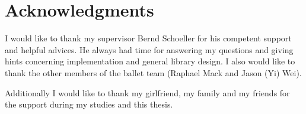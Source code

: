 \chapter*{Acknowledgments}
\label{sec:Acknowledgments}

I would like to thank my supervisor Bernd Schoeller for his competent support and helpful advices. He always had time for answering my questions and giving hints concerning implementation and general library design. I also would like to thank the other members of the ballet team (Raphael Mack and Jason (Yi) Wei).

Additionally I would like to thank my girlfriend, my family and my friends for the support during my studies and this thesis.
